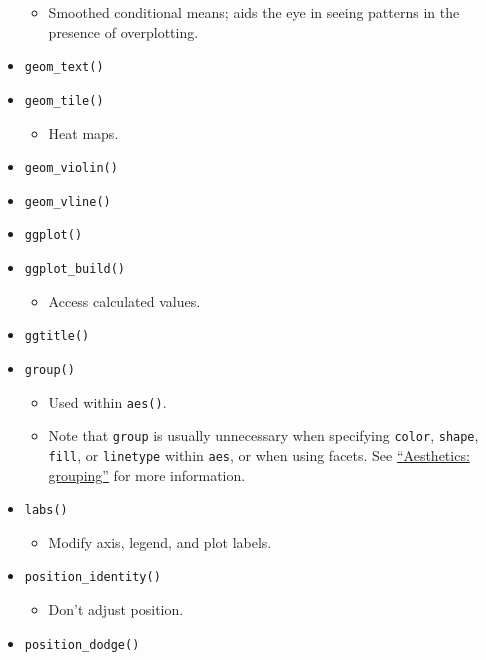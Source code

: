 \documentclass[
]{book}
\providecommand{\tightlist}{%
  \setlength{\itemsep}{0pt}\setlength{\parskip}{0pt}}
\begin{document}
\begin{itemize}
  \begin{itemize}
  \tightlist
  \item
    Smoothed conditional means; aids the eye in seeing patterns in the presence of overplotting.
  \end{itemize}
\item
  \texttt{geom\_text()}
\item
  \texttt{geom\_tile()}

  \begin{itemize}
  \tightlist
  \item
    Heat maps.
  \end{itemize}
\item
  \texttt{geom\_violin()}
\item
  \texttt{geom\_vline()}
\item
  \texttt{ggplot()}
\item
  \texttt{ggplot\_build()}

  \begin{itemize}
  \tightlist
  \item
    Access calculated values.
  \end{itemize}
\item
  \texttt{ggtitle()}
\item
  \texttt{group()}

  \begin{itemize}
  \tightlist
  \item
    Used within \texttt{aes()}.
  \item
    Note that \texttt{group} is usually unnecessary when specifying \texttt{color}, \texttt{shape}, \texttt{fill}, or \texttt{linetype} within \texttt{aes}, or when using facets. See \href{https://ggplot2.tidyverse.org/reference/aes_group_order.html}{``Aesthetics: grouping''} for more information.
  \end{itemize}
\item
  \texttt{labs()}

  \begin{itemize}
  \tightlist
  \item
    Modify axis, legend, and plot labels.
  \end{itemize}
\item
  \texttt{position\_identity()}

  \begin{itemize}
  \tightlist
  \item
    Don't adjust position.
  \end{itemize}
\item
  \texttt{position\_dodge()}


\end{itemize}
\end{document}

